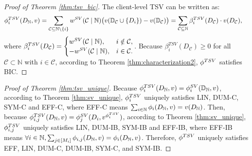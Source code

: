 \begin{proof}[Proof of Theorem \ref{thm:tsv_bic}]
	The client-level TSV can be written as:
	\begin{align*}
		& \phi^{TSV}_i(D_{\mathbb{N}}, v) = \sum_{\mathcal{C} \subseteq \mathbb{N} \setminus \{i\}} w^{SV}(\mathcal{C} \mid \mathbb{N})\big(v(\mathbb{D}_{\mathcal{C}} \cup \{D_i\}) - v(\mathbb{D}_{\mathcal{C}})\big) =  \sum_{\mathcal{C} \subseteq \mathbb{N}} \beta^{TSV}_i(D_\mathcal{C}) \cdot v(D_\mathcal{C}),
	\end{align*}
	where $\beta^{TSV}_i(D_\mathcal{C}) = \begin{cases}
		w^{SV}(\mathcal{C} \mid \mathbb{N}), & i\notin \mathcal{C},\\
		- w^{SV}(\mathcal{C} \mid \mathbb{N}), & i\in \mathcal{C}.
	\end{cases}$. 
	Because $\beta^{TSV}_i(D_\mathcal{C}) \geq 0$ for all $\mathcal{C} \subset \mathbb{N}$ with $i\in \mathcal{C}$, according to Theorem \ref{thm:characterization2}, $\phi^{TSV}$ satisfies BIC.
\end{proof}

\begin{proof}[Proof of Theorem \ref{thm:tsv_unique}]
	Because $\phi^{TSV}_i(D_{\mathbb{N}}, v) = \phi^{SV}_i(\mathbb{D}_{\mathbb{N}}, v)$, according to Theorem \ref{thm:sv_unique}, $\phi^{TSV}_i$ uniquely satisfies LIN, DUM-C, SYM-C and EFF-C, where EFF-C means $\sum_{i\in \mathbb{N}} \phi_i(D_{\mathbb{N}}, v) = v(D_{\mathbb{N}})$.
	Then, because $\phi^{TSV}_{i,j}(D_{\mathbb{N}}, v) = \phi^{SV}_j(D_i, v^{\phi^{TSV}_i})$, according to Theorem \ref{thm:sv_unique}, $\phi^{TSV}_{i,j}$ uniquely satisfies LIN, DUM-IB, SYM-IB and EFF-IB, where EFF-IB means $\forall i\in \mathbb{N}, \sum_{j\in [M_i]} \phi_{i,j}(D_{\mathbb{N}}, v) = \phi_i(D_{\mathbb{N}}, v)$.
	Therefore, $\phi^{TSV}$ uniquely satisfies EFF, LIN, DUM-C, DUM-IB, SYM-C, and SYM-IB.
\end{proof}